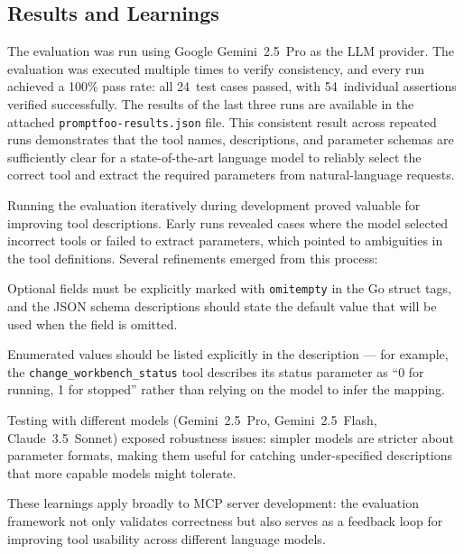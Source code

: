 \documentclass[
  digital,     %
  oneside,     %
  nosansbold,  %
  nocolorbold, %
  lof,         %
  lot,         %
]{fithesis4}
\begin{document}
\subsection{Results and Learnings}
\label{subsec:eval-results}

The evaluation was run using Google Gemini~2.5~Pro as the LLM provider. The
evaluation was executed multiple times to verify consistency, and every run
achieved a 100\% pass rate: all 24~test cases passed, with 54~individual
assertions verified successfully. The results of the last three runs are
available in the attached \texttt{promptfoo-results.json} file. This
consistent result across repeated runs demonstrates that the tool names,
descriptions, and parameter schemas are sufficiently clear for a
state-of-the-art language model to reliably select the correct tool and
extract the required parameters from natural-language requests.

Running the evaluation iteratively during development proved valuable for
improving tool descriptions. Early runs revealed cases where the model
selected incorrect tools or failed to extract parameters, which pointed to
ambiguities in the tool definitions. Several refinements emerged from this
process:

\begin{compactitem}
  \item Optional fields must be explicitly marked with \texttt{omitempty} in
        the Go struct tags, and the JSON schema descriptions should state the
        default value that will be used when the field is omitted.
  \item Enumerated values should be listed explicitly in the description ---
        for example, the \texttt{change\_workbench\_status} tool describes its
        status parameter as \enquote{0 for running, 1 for stopped} rather than
        relying on the model to infer the mapping.
  \item Testing with different models (Gemini~2.5~Pro, Gemini~2.5~Flash,
        Claude~3.5~Sonnet) exposed robustness issues: simpler models are
        stricter about parameter formats, making them useful for catching
        under-specified descriptions that more capable models might tolerate.
\end{compactitem}

These learnings apply broadly to MCP server development: the evaluation
framework not only validates correctness but also serves as a feedback loop
for improving tool usability across different language models.
\end{document}
